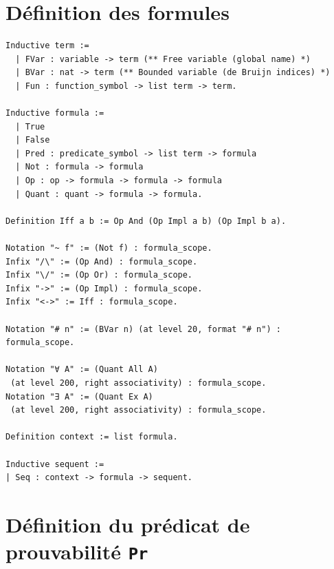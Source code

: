 \documentclass[a4paper]{article}
\begin{document}


\section{Définition des formules} \label{form}

\begin{verbatim}
Inductive term :=
  | FVar : variable -> term (** Free variable (global name) *)
  | BVar : nat -> term (** Bounded variable (de Bruijn indices) *)
  | Fun : function_symbol -> list term -> term.

Inductive formula :=
  | True
  | False
  | Pred : predicate_symbol -> list term -> formula
  | Not : formula -> formula
  | Op : op -> formula -> formula -> formula
  | Quant : quant -> formula -> formula.
  
Definition Iff a b := Op And (Op Impl a b) (Op Impl b a). 

Notation "~ f" := (Not f) : formula_scope.
Infix "/\" := (Op And) : formula_scope.
Infix "\/" := (Op Or) : formula_scope.
Infix "->" := (Op Impl) : formula_scope.
Infix "<->" := Iff : formula_scope.

Notation "# n" := (BVar n) (at level 20, format "# n") : formula_scope.

Notation "∀ A" := (Quant All A)
 (at level 200, right associativity) : formula_scope.
Notation "∃ A" := (Quant Ex A)
 (at level 200, right associativity) : formula_scope.
 
Definition context := list formula.

Inductive sequent :=
| Seq : context -> formula -> sequent.
\end{verbatim}

\section{Définition du prédicat de prouvabilité \texttt{Pr}} \label{pr}
\end{document}
